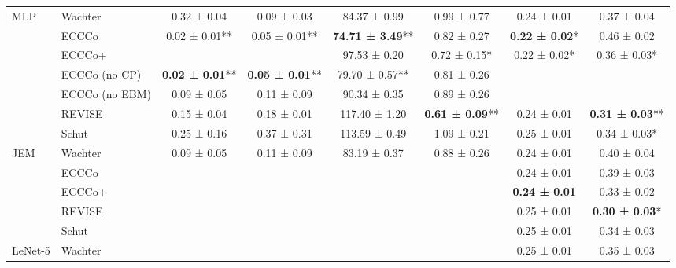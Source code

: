 \begin{table*}[t]
{\begin{tabular}[t]{llcccccc}
\multirow{-7}{*}{\raggedright\arraybackslash MLP} & Wachter & 0.32 ± 0.04\hphantom{*}\hphantom{*} & 0.09 ± 0.03\hphantom{*}\hphantom{*} & 84.37 ± 0.99\hphantom{*}\hphantom{*} & 0.99 ± 0.77\hphantom{*}\hphantom{*} & 0.24 ± 0.01\hphantom{*}\hphantom{*} & 0.37 ± 0.04\hphantom{*}\hphantom{*}\\
\cmidrule{1-8}
 & ECCCo & 0.02 ± 0.01** & 0.05 ± 0.01** & \textbf{74.71 ± 3.49}** & 0.82 ± 0.27\hphantom{*}\hphantom{*} & \textbf{0.22 ± 0.02}*\hphantom{*} & 0.46 ± 0.02\hphantom{*}\hphantom{*}\\

 & ECCCo+ &  &  & 97.53 ± 0.20\hphantom{*}\hphantom{*} & 0.72 ± 0.15*\hphantom{*} & 0.22 ± 0.02*\hphantom{*} & 0.36 ± 0.03*\hphantom{*}\\

 & ECCCo (no CP) & \textbf{0.02 ± 0.01}** & \textbf{0.05 ± 0.01}** & 79.70 ± 0.57** & 0.81 ± 0.26\hphantom{*}\hphantom{*} &  & \\

 & ECCCo (no EBM) & 0.09 ± 0.05\hphantom{*}\hphantom{*} & 0.11 ± 0.09\hphantom{*}\hphantom{*} & 90.34 ± 0.35\hphantom{*}\hphantom{*} & 0.89 ± 0.26\hphantom{*}\hphantom{*} &  & \\

 & REVISE & 0.15 ± 0.04\hphantom{*}\hphantom{*} & 0.18 ± 0.01\hphantom{*}\hphantom{*} & 117.40 ± 1.20\hphantom{*}\hphantom{*} & \textbf{0.61 ± 0.09}** & 0.24 ± 0.01\hphantom{*}\hphantom{*} & \textbf{0.31 ± 0.03}**\\

 & Schut & 0.25 ± 0.16\hphantom{*}\hphantom{*} & 0.37 ± 0.31\hphantom{*}\hphantom{*} & 113.59 ± 0.49\hphantom{*}\hphantom{*} & 1.09 ± 0.21\hphantom{*}\hphantom{*} & 0.25 ± 0.01\hphantom{*}\hphantom{*} & 0.34 ± 0.03*\hphantom{*}\\

\multirow{-7}{*}{\raggedright\arraybackslash JEM} & Wachter & 0.09 ± 0.05\hphantom{*}\hphantom{*} & 0.11 ± 0.09\hphantom{*}\hphantom{*} & 83.19 ± 0.37\hphantom{*}\hphantom{*} & 0.88 ± 0.26\hphantom{*}\hphantom{*} & 0.24 ± 0.01\hphantom{*}\hphantom{*} & 0.40 ± 0.04\hphantom{*}\hphantom{*}\\
\cmidrule{1-8}
 & ECCCo &  &  &  &  & 0.24 ± 0.01\hphantom{*}\hphantom{*} & 0.39 ± 0.03\hphantom{*}\hphantom{*}\\

 & ECCCo+ &  &  &  &  & \textbf{0.24 ± 0.01}\hphantom{*}\hphantom{*} & 0.33 ± 0.02\hphantom{*}\hphantom{*}\\

 & REVISE &  &  &  &  & 0.25 ± 0.01\hphantom{*}\hphantom{*} & \textbf{0.30 ± 0.03}*\hphantom{*}\\

 & Schut &  &  &  &  & 0.25 ± 0.01\hphantom{*}\hphantom{*} & 0.34 ± 0.03\hphantom{*}\hphantom{*}\\

\multirow{-5}{*}{\raggedright\arraybackslash LeNet-5} & Wachter &  &  &  &  & 0.25 ± 0.01\hphantom{*}\hphantom{*} & 0.35 ± 0.03\hphantom{*}\hphantom{*}\\
\bottomrule
\end{tabular}}
\end{table*}
